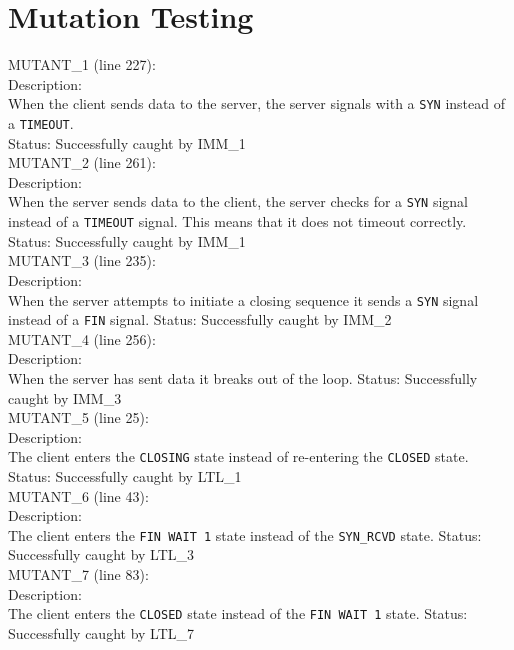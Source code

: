 \documentclass{WigReport}
\begin{document}
\section{Mutation Testing}

MUTANT\_1 (line 227):\\
Description:\\
When the client sends data to the server, the server signals with a \verb|SYN| instead of a \verb|TIMEOUT|.\\
Status: Successfully caught by IMM\_1
\\

MUTANT\_2 (line 261):\\
Description:\\
When the server sends data to the client, the server checks for a \verb|SYN| signal instead of a \verb|TIMEOUT| signal. This means that it does not timeout correctly.
Status: Successfully caught by IMM\_1
\\

MUTANT\_3 (line 235):\\
Description:\\
When the server attempts to initiate a closing sequence it sends a \verb|SYN| signal instead of a \verb|FIN| signal.
Status: Successfully caught by IMM\_2
\\

MUTANT\_4 (line 256):\\
Description:\\
When the server has sent data it breaks out of the loop.
Status: Successfully caught by IMM\_3
\\

MUTANT\_5 (line 25):\\
Description:\\
The client enters the \verb|CLOSING| state instead of re-entering the \verb|CLOSED| state.
Status: Successfully caught by LTL\_1
\\

MUTANT\_6 (line 43):\\
Description:\\
The client enters the \verb|FIN WAIT 1| state instead of the \verb|SYN_RCVD| state.
Status: Successfully caught by LTL\_3
\\

MUTANT\_7 (line 83):\\
Description:\\
The client enters the \verb|CLOSED| state instead of the \verb|FIN WAIT 1| state.
Status: Successfully caught by LTL\_7
\\
\end{document}
